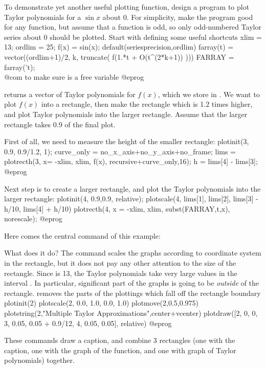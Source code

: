 To demonstrate yet another useful plotting function, design a program to
plot Taylor polynomials for a $\sin x$ about 0.  For simplicity, make the
program good for any function, but assume that a function is odd, so only
odd-numbered Taylor series about 0 should be plotted.  Start with defining
some useful shortcuts
\bprog
xlim = 13;  ordlim = 25;  f(x) = sin(x);
default(seriesprecision,ordlim)
farray(t) = vector((ordlim+1)/2, k, truncate( f(1.*t + O(t^(2*k+1)) )))
FARRAY = farray('t);  \\@com{} to make sure  is a free variable
@eprog

\noindent {} returns a vector of Taylor polynomials for
$f(x)$, which we store in .  We want to plot $f(x)$ into a
rectangle, then make the rectangle which is 1.2 times higher, and plot
Taylor polynomials into the larger rectangle.  Assume that the larger
rectangle takes 0.9 of the final plot.

First of all, we need to measure the height of the smaller rectangle:
\bprog
plotinit(3, 0.9, 0.9/1.2, 1);
curve_only = no_x_axis+no_y_axis+no_frame;
lims = plotrecth(3, x= -xlim, xlim, f(x), recursive+curve_only,16);
h = lims[4] - lims[3];
@eprog

\noindent Next step is to create a larger rectangle, and plot the Taylor
polynomials into the larger rectangle:
\bprog
plotinit(4, 0.9,0.9, relative);
plotscale(4, lims[1], lims[2], lims[3] - h/10, lims[4] + h/10)
plotrecth(4, x = -xlim, xlim, subst(FARRAY,t,x), norescale);
@eprog

Here comes the central command of this example:


\noindent What does it do?  The command 
scales the graphs according to coordinate system in the 
rectangle, but it does not pay any other attention to the size of
the rectangle.  Since  is 13, the Taylor polynomials take 
very large values in the interval .  In particular,
significant part of the graphs is going to be \emph{outside} of the rectangle.
 removes the parts of the plottings which fall off the
rectangle boundary
\bprog
plotinit(2)
plotscale(2, 0.0, 1.0, 0.0, 1.0)
plotmove(2,0.5,0.975)
plotstring(2,"Multiple Taylor Approximations",center+vcenter)
plotdraw([2, 0, 0,  3, 0.05, 0.05 + 0.9/12,  4, 0.05, 0.05], relative)
@eprog

These commands draw a caption, and combine 3 rectangles (one with the
caption, one with the graph of the function, and one with graph of Taylor
polynomials) together.

